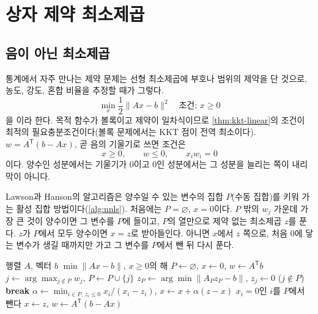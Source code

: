 \section{상자 제약 최소제곱}
\label{sec:bounded-lsq}

\subsection{음이 아닌 최소제곱}

통계에서 자주 만나는 제약 문제는 선형 최소제곱에 부호나 범위의 제약을 단 것으로, 농도, 강도, 혼합 비율을 추정할 때가 그렇다.
\[
\min_x\frac12\|Ax-b\|^2\quad\text{조건: }x\ge0
\]
을 이라 한다. 목적 함수가 볼록이고 제약이 일차식이므로 \cref{thm:kkt-linear}의 조건이 최적의 필요충분조건이다(볼록 문제에서는 KKT 점이 전역 최소이다). $w=A^{\mathsf T}(b-Ax)$, 곧 음의 기울기로 쓰면 조건은
\[
x\ge0,\qquad w\le0,\qquad x_iw_i=0
\]
이다. 양수인 성분에서는 기울기가 $0$이고 $0$인 성분에서는 그 성분을 늘리는 쪽이 내리막이 아니다.

Lawson과 Hanson의 알고리즘\cite{lawson1995}은 양수일 수 있는 변수의 집합 $P$(수동 집합)를 키워 가는 활성 집합 방법이다(\cref{alg:nnls}). 처음에는 $P=\varnothing$, $x=0$이다. $P$ 밖의 $w_j$ 가운데 가장 큰 것이 양수이면 그 변수를 $P$에 들이고, $P$의 열만으로 제약 없는 최소제곱 $z$를 푼다. $z$가 $P$에서 모두 양수이면 $x=z$로 받아들인다. 아니면 $x$에서 $z$ 쪽으로, 처음 $0$에 닿는 변수가 생길 때까지만 가고 그 변수를 $P$에서 뺀 뒤 다시 푼다.

\begin{algorithm}[t]
\begin{algorithmic}[1]
\Require 행렬 $A$, 벡터 $b$
\Ensure $\min\|Ax-b\|$, $x\ge0$의 해
\State $P\gets\varnothing$, $x\gets0$, $w\gets A^{\mathsf T}b$
  \State $j\gets\arg\max_{j\notin P}w_j$, $P\gets P\cup\{j\}$
  \Loop
    \State $z_P\gets\arg\min\|A_Pz_P-b\|$, $z_j\gets0$ ($j\notin P$) 
     \State \textbf{break} \EndIf
    \State $\alpha\gets\min_{i\in P,\,z_i\le0}x_i/(x_i-z_i)$, $x\gets x+\alpha(z-x)$
    \State $x_i=0$인 $i$를 $P$에서 뺀다
  \EndLoop
  \State $x\gets z$, $w\gets A^{\mathsf T}(b-Ax)$
\EndWhile
\end{algorithmic}
\caption{Lawson--Hanson의 NNLS}
\label{alg:nnls}
\end{algorithm}

